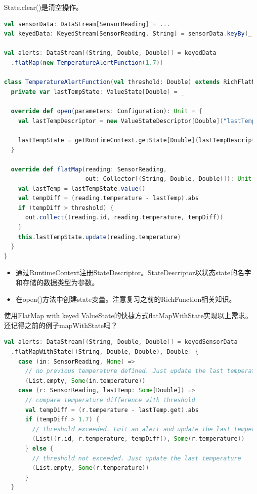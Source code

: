 \documentclass[oneside]{ctexbook}
\begin{document}
State.clear()是清空操作。

\begin{lstlisting}[language=scala]
val sensorData: DataStream[SensorReading] = ...
val keyedData: KeyedStream[SensorReading, String] = sensorData.keyBy(_.id)

val alerts: DataStream[(String, Double, Double)] = keyedData
  .flatMap(new TemperatureAlertFunction(1.7))

class TemperatureAlertFunction(val threshold: Double) extends RichFlatMapFunction[SensorReading, (String, Double, Double)] {
  private var lastTempState: ValueState[Double] = _

  override def open(parameters: Configuration): Unit = {
    val lastTempDescriptor = new ValueStateDescriptor[Double]("lastTemp", classOf[Double])

    lastTempState = getRuntimeContext.getState[Double](lastTempDescriptor)
  }

  override def flatMap(reading: SensorReading,
                       out: Collector[(String, Double, Double)]): Unit = {
    val lastTemp = lastTempState.value()
    val tempDiff = (reading.temperature - lastTemp).abs
    if (tempDiff > threshold) {
      out.collect((reading.id, reading.temperature, tempDiff))
    }
    this.lastTempState.update(reading.temperature)
  }
}
\end{lstlisting}

\begin{itemize}
\item 通过RuntimeContext注册StateDescriptor。StateDescriptor以状态state的名字和存储的数据类型为参数。
\item 在open()方法中创建state变量。注意复习之前的RichFunction相关知识。
\end{itemize}

使用FlatMap with keyed ValueState的快捷方式flatMapWithState实现以上需求。还记得之前的例子mapWithState吗？

\begin{lstlisting}[language=scala]
val alerts: DataStream[(String, Double, Double)] = keyedSensorData
  .flatMapWithState[(String, Double, Double), Double] {
    case (in: SensorReading, None) =>
      // no previous temperature defined. Just update the last temperature
      (List.empty, Some(in.temperature))
    case (r: SensorReading, lastTemp: Some[Double]) =>
      // compare temperature difference with threshold
      val tempDiff = (r.temperature - lastTemp.get).abs
      if (tempDiff > 1.7) {
        // threshold exceeded. Emit an alert and update the last temperature
        (List((r.id, r.temperature, tempDiff)), Some(r.temperature))
      } else {
        // threshold not exceeded. Just update the last temperature
        (List.empty, Some(r.temperature))
      }
  }
\end{lstlisting}
\end{document}
